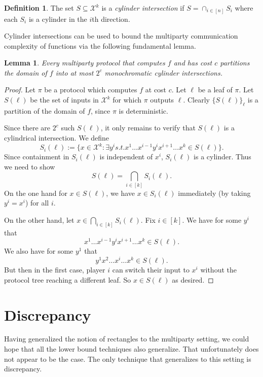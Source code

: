 \documentclass[11pt]{amsart}
\theoremstyle{plain}
\newtheorem{lemma}{Lemma}
\theoremstyle{definition}
\newtheorem{definition}{Definition}
\theoremstyle{plain}
\newcommand{\calX}{\mathcal{X}}
\begin{document}
\begin{definition}
The set $S \subseteq \calX^k$ is a \emph{cylinder intersection} if $S = \cap_{i \in [n]} S_i$ where each $S_i$ is a cylinder in the $i$th direction.
\end{definition}

Cylinder intersections can be used to bound the multiparty communication complexity of functions via the following fundamental lemma.

\begin{lemma}
Every multiparty protocol that computes $f$ and has cost $c$ partitions the domain of $f$ into at most $2^c$ monochromatic cylinder intersections.
\end{lemma}

\begin{proof}
Let $\pi$ be a protocol which computes $f$ at cost $c$. Let $\ell$ be a leaf of $\pi$. Let $S(\ell)$ be the set of inputs in $\calX^k$ for which $\pi$ outputs $\ell$. Clearly $\{S(\ell)\}_\ell$ is a partition of the domain of $f$, since $\pi$ is deterministic.

Since there are $2^c$ such $S(\ell)$, it only remains to verify that $S(\ell)$ is a cylindrical intersection. We define
$$S_i(\ell):=\{x \in \calX^k: \exists y^i s.t. x^1\dots x^{i-1}y^ix^{i+1}\dots x^k \in S(\ell)\}.$$
Since containment in $S_i(\ell)$ is independent of $x^i$, $S_i(\ell)$ is a cylinder. Thus we need to show
$$S(\ell) = \bigcap_{i\in[k]} S_i(\ell).$$
On the one hand for $x\in S(\ell)$, we have $x\in S_i(\ell)$ immediately (by taking $y^i = x^i$) for all $i$. 

On the other hand, let $x \in \bigcap_{i\in [k]} S_i(\ell).$ Fix $i\in[k]$. We have for some $y^i$ that
$$x^1\dots x^{i-1}y^ix^{i+1}\dots x^k \in S(\ell).$$
We also have for some $y^1$ that
$$y^1x^2\dots x^i\dots x^k\in S(\ell).$$
But then in the first case, player $i$ can switch their input to $x^i$ without the protocol tree reaching a different leaf. So $x \in S(\ell)$ as desired.
\end{proof}



\newpage 
\section{Discrepancy}

Having generalized the notion of rectangles to the multiparty setting, we could hope that all the lower bound techniques also generalize. That unfortunately does not appear to be the case. The only technique that generalizes to this setting is discrepancy.
\end{document}
